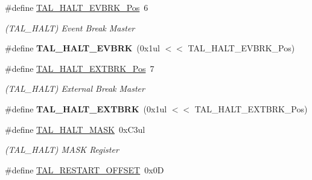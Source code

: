 \begin{DoxyCompactItemize}
\item 
\hypertarget{group___s_a_m_l21___t_a_l_gac783c602bd447f5eb4c20d74e1bd8935}{}\#define \hyperlink{group___s_a_m_l21___t_a_l_gac783c602bd447f5eb4c20d74e1bd8935}{T\+A\+L\+\_\+\+H\+A\+L\+T\+\_\+\+E\+V\+B\+R\+K\+\_\+\+Pos}~6\label{group___s_a_m_l21___t_a_l_gac783c602bd447f5eb4c20d74e1bd8935}

\begin{DoxyCompactList}\small\item\em (T\+A\+L\+\_\+\+H\+A\+L\+T) Event Break Master \end{DoxyCompactList}\item 
\hypertarget{group___s_a_m_l21___t_a_l_ga651f1a74d6e06aa517b1f5cb14b73efe}{}\#define {\bfseries T\+A\+L\+\_\+\+H\+A\+L\+T\+\_\+\+E\+V\+B\+R\+K}~(0x1ul $<$$<$ T\+A\+L\+\_\+\+H\+A\+L\+T\+\_\+\+E\+V\+B\+R\+K\+\_\+\+Pos)\label{group___s_a_m_l21___t_a_l_ga651f1a74d6e06aa517b1f5cb14b73efe}

\item 
\hypertarget{group___s_a_m_l21___t_a_l_ga4637413e3593f93aa3052ed859932aec}{}\#define \hyperlink{group___s_a_m_l21___t_a_l_ga4637413e3593f93aa3052ed859932aec}{T\+A\+L\+\_\+\+H\+A\+L\+T\+\_\+\+E\+X\+T\+B\+R\+K\+\_\+\+Pos}~7\label{group___s_a_m_l21___t_a_l_ga4637413e3593f93aa3052ed859932aec}

\begin{DoxyCompactList}\small\item\em (T\+A\+L\+\_\+\+H\+A\+L\+T) External Break Master \end{DoxyCompactList}\item 
\hypertarget{group___s_a_m_l21___t_a_l_ga7e7828b0720eb3c2cb02d15d1a63e149}{}\#define {\bfseries T\+A\+L\+\_\+\+H\+A\+L\+T\+\_\+\+E\+X\+T\+B\+R\+K}~(0x1ul $<$$<$ T\+A\+L\+\_\+\+H\+A\+L\+T\+\_\+\+E\+X\+T\+B\+R\+K\+\_\+\+Pos)\label{group___s_a_m_l21___t_a_l_ga7e7828b0720eb3c2cb02d15d1a63e149}

\item 
\hypertarget{group___s_a_m_l21___t_a_l_ga959a96bf954959acdef5147ce48bb7dc}{}\#define \hyperlink{group___s_a_m_l21___t_a_l_ga959a96bf954959acdef5147ce48bb7dc}{T\+A\+L\+\_\+\+H\+A\+L\+T\+\_\+\+M\+A\+S\+K}~0x\+C3ul\label{group___s_a_m_l21___t_a_l_ga959a96bf954959acdef5147ce48bb7dc}

\begin{DoxyCompactList}\small\item\em (T\+A\+L\+\_\+\+H\+A\+L\+T) M\+A\+S\+K Register \end{DoxyCompactList}\item 
\hypertarget{group___s_a_m_l21___t_a_l_ga5ccca1cc431981a05417e9967e7b537d}{}\#define \hyperlink{group___s_a_m_l21___t_a_l_ga5ccca1cc431981a05417e9967e7b537d}{T\+A\+L\+\_\+\+R\+E\+S\+T\+A\+R\+T\+\_\+\+O\+F\+F\+S\+E\+T}~0x0\+D\label{group___s_a_m_l21___t_a_l_ga5ccca1cc431981a05417e9967e7b537d}


\end{DoxyCompactItemize}
